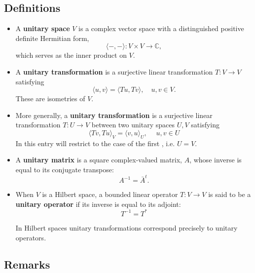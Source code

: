 \documentclass[12pt]{article}
\newcommand{\cnums}{\mathbb{C}}
\begin{document}
\subsection{Definitions}
\begin{itemize}
\item A {\bf unitary space} $V$ is a complex vector space with a
distinguished positive definite Hermitian form,
$$
\langle -,-\rangle: V\times V \rightarrow \cnums,$$
which serves as
the inner product on $V$.  
\end{itemize}
\begin{itemize}
\item A {\bf unitary transformation} is a surjective linear transformation
$T:V\rightarrow V$ satisfying
\begin{equation}
  \label{eq:def}
\langle u,v \rangle = \langle Tu,Tv\rangle,\quad  u, v \in V.  
\end{equation}
These are isometries of $V$.
\end{itemize}
\begin{itemize}
\item More generally, a {\bf unitary transformation} is a surjective linear transformation $T:U \longrightarrow V$ between two unitary spaces $U,V$ satisfying
\begin{displaymath}
\langle Tv , Tu \rangle_{V} = \langle v , u \rangle_{U},\quad\; u,v \in U
\end{displaymath}
In this entry will restrict to the case of the first , i.e. $U = V$.
\end{itemize}
\begin{itemize}
\item A {\bf unitary matrix} is a square complex-valued matrix, $A$, whose inverse 
is equal to its conjugate transpose:
$$A^{-1}=\bar{A}^t.$$
\end{itemize}
\begin{itemize}
\item When $V$ is a Hilbert space, a bounded linear operator $T:V \longrightarrow V$ is said to be a {\bf unitary operator} if its inverse is equal to its adjoint:
\begin{displaymath}
T^{-1} = T^*
\end{displaymath}

In Hilbert spaces unitary transformations correspond precisely to unitary operators.
\end{itemize}

\subsection{Remarks}
\end{document}
